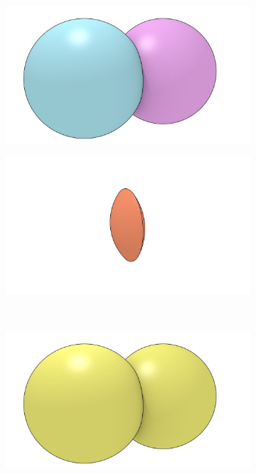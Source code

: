 \begin{figure}
\centering
\begin{subfigure}[b]{0.5\linewidth}
\includegraphics[width=\linewidth]{figs/boolean}
\caption{}%
\label{subfig:boolean}
\end{subfigure}%
\begin{subfigure}[b]{0.5\linewidth}
\includegraphics[width=\linewidth]{figs/boolean-intersection}
\caption{}%
\label{subfig:boolean-intersection}
\end{subfigure}\\
\begin{subfigure}[b]{0.5\linewidth}
\includegraphics[width=\linewidth]{figs/boolean-union}

\end{subfigure}
\end{figure}

